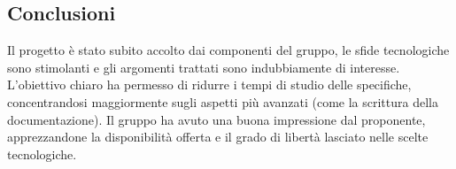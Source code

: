\documentclass[../studio-di-fattibilita.tex]{subfiles}
\begin{document}
  \subsection{Conclusioni}%
  \label{subsec:conclusioni}
  Il progetto è stato subito accolto dai componenti del gruppo, le sfide tecnologiche sono stimolanti e gli argomenti trattati sono indubbiamente di interesse. L'obiettivo chiaro ha permesso di ridurre i tempi di studio delle specifiche, concentrandosi maggiormente sugli aspetti più avanzati (come la scrittura della documentazione). Il gruppo ha avuto una buona impressione dal proponente, apprezzandone la disponibilità offerta e il grado di libertà lasciato nelle scelte tecnologiche.
\end{document}
